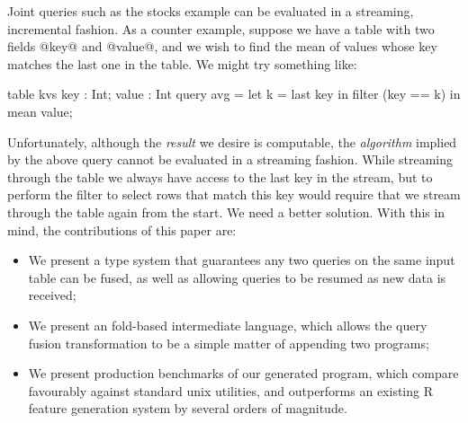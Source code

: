 Joint queries such as the stocks example can be evaluated in a streaming, incremental fashion. As a counter example, suppose we have a table with two fields @key@ and @value@, and we wish to find the mean of values whose key matches the last one in the table. We might try something like:
\begin{code}
  table kvs { key : Int; value : Int }
  query avg = let k = last key
              in  filter (key == k) in mean value;
\end{code}
Unfortunately, although the \emph{result} we desire is computable, the \emph{algorithm} implied by the above query cannot be evaluated in a streaming fashion. While streaming through the table we always have access to the last key in the stream, but to perform the filter to select rows that match this key would require that we stream through the table again from the start. We need a better solution. With this in mind, the contributions of this paper are:
\begin{itemize}
\item
We present a type system that guarantees any two queries on the same input table can be fused, as well as allowing queries to be resumed as new data is received;

\item
We present an fold-based intermediate language, which allows the query fusion transformation to be a simple matter of appending two programs;

\item
We present production benchmarks of our generated program, which compare favourably against standard unix utilities, and outperforms an existing R feature generation system by several orders of magnitude.
\end{itemize}





